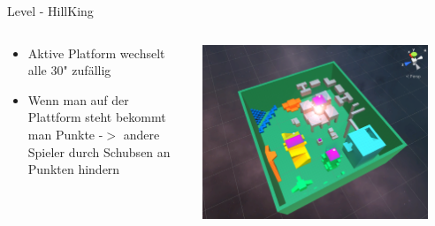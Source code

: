 \documentclass[xcolor=dvipsnames]{beamer}
\begin{document}
\begin{frame}{Level - HillKing}
\begin{columns}
\begin{column}{0.5\textwidth}
	\begin{itemize}
		\item Aktive Platform wechselt alle 30" zufällig 
		\item Wenn man auf der Plattform steht bekommt man Punkte -$>$ andere Spieler durch Schubsen an Punkten hindern 
	\end{itemize}
\end{column}
\begin{column}{0.5\textwidth} 
	\begin{center}
		\includegraphics[width=0.9\textwidth]{level_hillking.png}
	\end{center}
\end{column}
\end{columns}

\end{frame}
\end{document}
